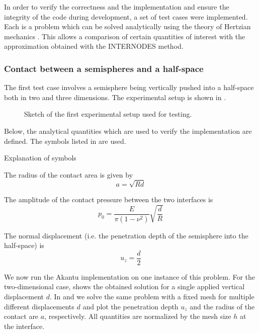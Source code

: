 \documentclass[11pt, a4paper]{article}
\begin{document}
In order to verify the correctness and the implementation and ensure the integrity of the code during development, a set of test cases were implemented. Each is a problem which can be solved analytically using the theory of Hertzian mechanics \cite{johnson}. This allows a comparison of certain quantities of interest with the approximation obtained with the INTERNODES method. 

\subsubsection{Contact between a semispheres and a half-space}

The first test case involves a semisphere being vertically pushed into a half-space both in two and three dimensions. The experimental setup is shown in .

\begin{figure}[ht]
    \centering
    
    \caption{Sketch of the first experimental setup used for testing.}
    \label{fig:sketch-plane-sphere}
\end{figure}

Below, the analytical quantities which are used to verify the implementation are defined. The symbols listed in  are used.

\begin{table}[ht]
    \caption{Explanation of symbols}
    \label{tab:symbols}
    \centering
    
\end{table}

The radius of the contact area is given by
\begin{equation}
    a = \sqrt{Rd}
    \label{equ:contact-radius}
\end{equation}

The amplitude of the contact pressure between the two interfaces is
\begin{equation}
    p_0 = \frac{E}{\pi(1 - \nu^2)} \sqrt{\frac{d}{R}}
\end{equation}

The normal displacement (i.e. the penetration depth of the semisphere into the half-space) is
\begin{equation}
    u_z = \frac{d}{2}
    \label{equ:normal-displacement}
\end{equation}

We now run the Akantu implementation on one instance of this problem. For the two-dimensional case,  shows the obtained solution for a single applied vertical displacement $d$. In  and  we solve the same problem with a fixed mesh for multiple different displacements $d$ and plot the penetration depth $u_z$ and the radius of the contact are $a$, respectively. All quantities are normalized by the mesh size $h$ at the interface.
\end{document}
